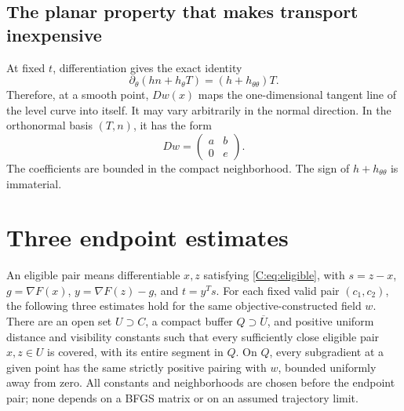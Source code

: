 

\subsection{The planar property that makes transport inexpensive}
At fixed $t$, differentiation gives the exact identity
\begin{equation}\label{C:eq:angleidentity}
 \partial_\theta(hn+h_\theta T)=(h+h_{\theta\theta})T.
\end{equation}
Therefore, at a smooth point, $Dw(x)$ maps the one-dimensional tangent line of the level curve into itself. It may vary arbitrarily in the normal direction. In the orthonormal basis $(T,n)$, it has the form
\begin{equation}\label{C:eq:triangular}
 Dw=\begin{pmatrix} a&b\\0&e\end{pmatrix}.
\end{equation}
The coefficients are bounded in the compact neighborhood. The sign of $h+h_{\theta\theta}$ is immaterial.


\setcounter{section}{4}
\setcounter{theorem}{4}
\setcounter{equation}{12}


\section{Three endpoint estimates}
An eligible pair means differentiable $x,z$ satisfying \eqref{C:eq:eligible}, with $s=z-x$, $g=\nabla F(x)$, $y=\nabla F(z)-g$, and $t=y^Ts$. For each fixed valid pair $(c_1,c_2)$, the following three estimates hold for the same objective-constructed field $w$. There are an open set $U\supset C$, a compact buffer $Q\supset\overline U$, and positive uniform distance and visibility constants such that every sufficiently close eligible pair $x,z\in U$ is covered, with its entire segment in $Q$. On $Q$, every subgradient at a given point has the same strictly positive pairing with $w$, bounded uniformly away from zero. All constants and neighborhoods are chosen before the endpoint pair; none depends on a BFGS matrix or on an assumed trajectory limit.

